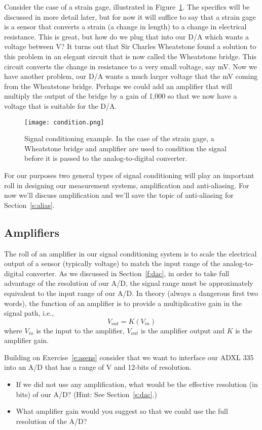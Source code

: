 Consider the case of a strain gage, illustrated in Figure~\ref{f:condition}.  The specifics will be discussed in more detail later, but for now it will suffice to say that a strain gage is a sensor that converts a strain (a change in length) to a change in electrical resistance.  This is great, but how do we plug that into our D/A which wants a voltage between \unit[0--10]{V}?  It turns out that Sir Charles Wheatstone found a solution to this problem in an elegant circuit that is now called the Wheatstone bridge.  This circuit converts the change in resistance to a very small voltage, say \unit[0--10]{mV}.  Now we have another problem, our D/A wants a much larger voltage that the \unit[10]{mV} coming from the Wheatstone bridge.  Perhaps we could add an amplifier that will multiply the output of the bridge by a gain of 1,000 so that we now have a  voltage that is suitable for the D/A.  

\begin{figure}[hbt!]
\centering
\texttt{[image: condition.png]}
\caption{Signal conditioning example.  In the case of the strain gage, a Wheatstone bridge and amplifier are used to condition the signal before it is passed to the analog-to-digital converter.}
\label{f:condition}
\end{figure}

For our purposes two general types of signal conditioning will play an important roll in designing our measurement systems, amplification and anti-aliasing.  For now we'll discuss amplification and we'll save the topic of anti-aliasing for Section~\ref{s:alias}.

\subsection{Amplifiers}
The roll of an amplifier in our signal conditioning system is to scale the electrical output of a sensor (typically voltage) to match the input range of the analog-to-digital converter.  As we discussed in Section~\ref{f:dac}, in order to take full advantage of the resolution of our A/D, the signal range must be approximately equivalent to the input range of our A/D.  In theory (always a dangerous first two words), the function of an amplifier is to provide a multiplicative gain in the signal path, i.e., 
\[
V_{out} = K\left(V_{in}\right)
\]
where $V_{in}$ is the input to the amplifier, $V_{out}$ is the amplifier output and $K$ is the amplifier gain. 

\begin{ex}
Building on Exercise~\ref{e:asens} consider that we want to interface our ADXL 335 into an A/D that has a range of \unit[0--10]{V} and 12-bits of resolution.  
\begin{itemize}
\item If we did not use any amplification, what would be the effective resolution (in bits) of our A/D?  (Hint: See Section~\ref{s:dac}.)
\item What amplifier gain would you suggest so that we could use the full resolution of the A/D?
\end{itemize}
\end{ex}

